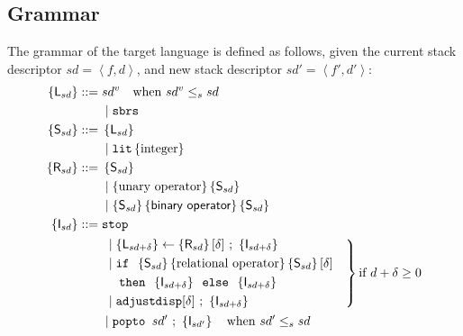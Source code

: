 \documentclass[12pt,twoside,a4paper]{report}
\theoremstyle{definition}
\theoremstyle{definition}
\theoremstyle{definition}
\theoremstyle{definition}
\newcommand{\bracket}[1]{\left\{ #1 \right\}}
\newcommand{\ang}[1]{\left\langle #1 \right\rangle}
\begin{document}
    \subsection{Grammar}
    The grammar of the target language is defined as follows, given the current stack descriptor $sd = \ang{f, d}$, and new stack descriptor $sd' = \ang{f', d'}$:
    \[\begin{aligned}
        \bracket{\textsf{L}_{sd}} ::={}& sd^v \quad \text{when } sd^v \leq_s sd \\
                        &\mid \texttt{sbrs}  \\
        \bracket{\textsf{S}_{sd}} ::={}& \bracket{\textsf{L}_{sd}} \\
                        &\mid \texttt{lit} \bracket{\text{integer}} \\
        \bracket{\textsf{R}_{sd}} ::={}& \bracket{\textsf{S}_{sd}} \\
                        &\mid \bracket{ \text{unary operator} } \bracket{ \textsf{S}_{sd}}\\
                        &\mid \bracket{\textsf{S}_{sd}} \bracket{\textsf{binary operator}} \bracket{ \textsf{S}_{sd} } \\
        \bracket{\textsf{I}_{sd}} ::={}& \texttt{stop} \\
                        &\left.
                        \begin{aligned}
                        &\mid \bracket{\textsf{L}_{sd+\delta}} \gets \bracket{\textsf{R}_{sd}}[\delta] \text{ ; } \bracket{\textsf{I}_{sd+\delta}} \\
                        &\mid \texttt{if } \bracket{\textsf{S}_{sd}} \bracket{\text{relational operator}} \bracket{\textsf{S}_{sd}}[\delta] \\
                        & \hphantom{\mid {}} \texttt{ then } \bracket{\textsf{I}_{sd+\delta}} \texttt{ else } \bracket{\textsf{I}_{sd+\delta}} \\
                        &\mid \texttt{adjustdisp} [\delta] \text{ ; } \bracket{\textsf{I}_{sd+\delta}} \\
                        \end{aligned}
                        \quad \right\} \text{if } d + \delta \geq 0  \\
                        &{}\mid \texttt{popto } sd' \text{ ; } \bracket{\textsf{I}_{sd'}} \quad \text{when } sd' \leq_s sd \\
    \end{aligned}\]
\end{document}
